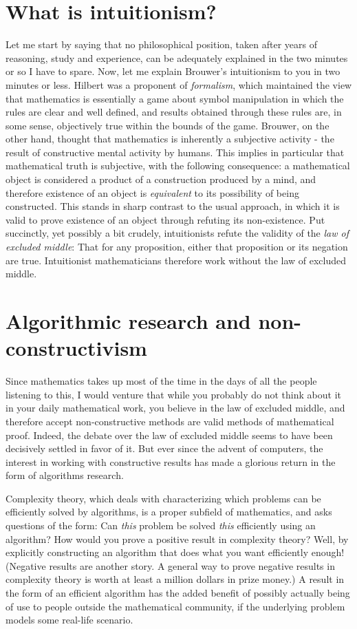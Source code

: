 \section{What is intuitionism?}
Let me start by saying that no philosophical position, taken after years of reasoning, study and experience, can be adequately explained in the two minutes or so I have to spare. Now, let me explain Brouwer's intuitionism to you in two minutes or less. Hilbert was a proponent of \emph{formalism}, which maintained the view that mathematics is essentially a game about symbol manipulation in which the rules are clear and well defined, and results obtained through these rules are, in some sense, objectively true within the bounds of the game. Brouwer, on the other hand, thought that mathematics is inherently a subjective activity - the result of constructive mental activity by humans. This implies in particular that mathematical truth is subjective, with the following consequence: a mathematical object is considered a product of a construction produced by a mind, and therefore existence of an object is \emph{equivalent} to its possibility of being constructed. This stands in sharp contrast to the usual approach, in which it is valid to prove existence of an object through refuting its non-existence. Put succinctly, yet possibly a bit crudely, intuitionists refute the validity of the \emph{law of excluded middle}: That for any proposition, either that proposition or its negation are true. Intuitionist mathematicians therefore work without the law of excluded middle. 

\section{Algorithmic research and non-constructivism}
Since mathematics takes up most of the time in the days of all the people listening to this, I would venture that while you probably do not think about it in your daily mathematical work, you believe in the law of excluded middle, and therefore accept non-constructive methods are valid methods of mathematical proof. Indeed, the debate over the law of excluded middle seems to have been decisively settled in favor of it. But ever since the advent of computers, the interest in working with constructive results has made a glorious return in the form of algorithms research. 

Complexity theory, which deals with characterizing which problems can be efficiently solved by algorithms, is a proper subfield of mathematics, and asks questions of the form: Can \emph{this} problem be solved \emph{this} efficiently using an algorithm? How would you prove a positive result in complexity theory? Well, by explicitly constructing an algorithm that does what you want efficiently enough! (Negative results are another story. A general way to prove negative results in complexity theory is worth at least a million dollars in prize money.) A result in the form of an efficient algorithm has the added benefit of possibly actually being of use to people outside the mathematical community, if the underlying problem models some real-life scenario.

